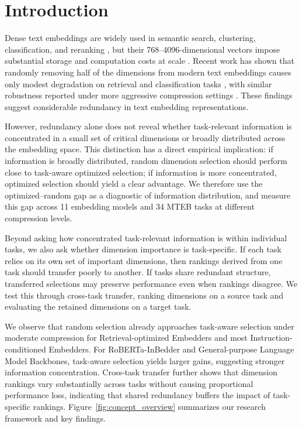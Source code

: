 \documentclass[11pt]{article}
\begin{document}
\section{Introduction}
Dense text embeddings are widely used in semantic search, clustering, classification, and reranking \citep{reimers-gurevych-2019-sentence, karpukhin-etal-2020-dense, khattab-zaharia-2020-colbert}, but their 768--4096-dimensional vectors impose substantial storage and computation costs at scale \citep{johnson-etal-2019-billion}. Recent work has shown that randomly removing half of the dimensions from modern text embeddings causes only modest degradation on retrieval and classification tasks \citep{takeshita2025randomly}, with similar robustness reported under more aggressive compression settings \citep{tsukagoshi2025redundancy}. These findings suggest considerable redundancy in text embedding representations.

However, redundancy alone does not reveal whether task-relevant information is concentrated in a small set of critical dimensions or broadly distributed across the embedding space. This distinction has a direct empirical implication: if information is broadly distributed, random dimension selection should perform close to task-aware optimized selection; if information is more concentrated, optimized selection should yield a clear advantage. We therefore use the optimized--random gap as a diagnostic of information distribution, and measure this gap across 11 embedding models and 34 MTEB tasks \citep{mteb} at different compression levels. 

Beyond asking how concentrated task-relevant information is within individual tasks, we also ask whether dimension importance is task-specific. If each task relies on its own set of important dimensions, then rankings derived from one task should transfer poorly to another. If tasks share redundant structure, transferred selections may preserve performance even when rankings disagree. We test this through cross-task transfer, ranking dimensions on a source task and evaluating the retained dimensions on a target task.

We observe that random selection already approaches task-aware selection under moderate compression for Retrieval-optimized Embedders and most Instruction-conditioned Embedders. For RoBERTa-InBedder and General-purpose Language Model Backbones, task-aware selection yields larger gains, suggesting stronger information concentration. Cross-task transfer further shows that dimension rankings vary substantially across tasks without causing proportional performance loss, indicating that shared redundancy buffers the impact of task-specific rankings. Figure~\ref{fig:concept_overview} summarizes our research framework and key findings.
\end{document}
